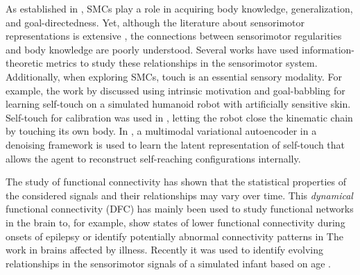 As established in \cite{Jacquey2019Sensorimotorcontingenciesas}, SMCs play a role in acquiring body knowledge, generalization, and goal-directedness. Yet, although the literature about sensorimotor representations is extensive \cite{Nguyen2021Sensorimotorrepresentationlearning}, the connections between sensorimotor regularities and body knowledge are poorly understood. Several works \cite{Schmidt2013Bootstrappingperceptionusing,Lungarella2006Mappinginformationflow,Polani2009Modelsinformationprocessing,Bossomaier2016introductiontransferentropy,Olsson2006unknownsensorsactuators} have used information-theoretic metrics to study these relationships in the sensorimotor system. Additionally, when exploring SMCs, touch is an essential sensory modality. For example, the work by \cite{Gama2021Goaldirectedtactile} discussed using intrinsic motivation and goal-babbling for learning self-touch on a simulated humanoid robot with artificially sensitive skin. Self-touch for calibration was used in \cite{Roncone2014Automatickinematicchain}, letting the robot close the kinematic chain by touching its own body. In \cite{Marcel2022Learningreachown}, a multimodal variational autoencoder in a denoising framework is used to learn the latent representation of self-touch that allows the agent to reconstruct self-reaching configurations internally.

The study of functional connectivity has shown that the statistical properties of the considered signals and their relationships may vary over time. This \emph{dynamical} functional connectivity (DFC) has mainly been used to study functional networks in the brain to, for example, show states of lower functional connectivity during onsets of epilepsy\cite{Christiaen2020Dynamicfunctionalconnectivity} or identify potentially abnormal connectivity patterns in The work in brains affected by illness\cite{Zhou2020Earlychildhooddevelopmental}. Recently it was used to identify evolving relationships in the sensorimotor signals of a simulated infant based on age \cite{Kanazawa2023Openendedmovements}. %

